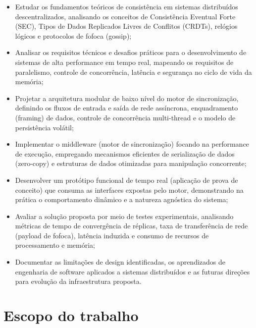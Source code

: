\begin{itemize}
    \item Estudar os fundamentos teóricos de consistência em sistemas
    distribuídos descentralizados, analisando os conceitos de Consistência
    Eventual Forte (SEC), Tipos de Dados Replicados Livres de Conflitos
    (CRDTs), relógios lógicos e protocolos de fofoca (gossip);

    \item Analisar os requisitos técnicos e desafios práticos para o
    desenvolvimento de sistemas de alta performance em tempo real, mapeando
    os requisitos de paralelismo, controle de concorrência, latência e
    segurança no ciclo de vida da memória;

    \item Projetar a arquitetura modular de baixo nível do motor de
    sincronização, definindo os fluxos de entrada e saída de rede
    assíncrona, enquadramento (framing) de dados, controle de concorrência
    multi-thread e o modelo de persistência volátil;

    \item Implementar o middleware (motor de sincronização) focando na
    performance de execução, empregando mecanismos eficientes de
    serialização de dados (zero-copy) e estruturas de dados otimizadas
    para manipulação concorrente;

    \item Desenvolver um protótipo funcional de tempo real (aplicação de
    prova de conceito) que consuma as interfaces expostas pelo motor,
    demonstrando na prática o comportamento dinâmico e a natureza
    agnóstica do sistema;

    \item Avaliar a solução proposta por meio de testes experimentais,
    analisando métricas de tempo de convergência de réplicas, taxa de
    transferência de rede (payload de fofoca), latência induzida e
    consumo de recursos de processamento e memória;

    \item Documentar as limitações de design identificadas, os
    aprendizados de engenharia de software aplicados a sistemas
    distribuídos e as futuras direções para evolução da infraestrutura
    proposta.
\end{itemize}

\section{Escopo do trabalho}

